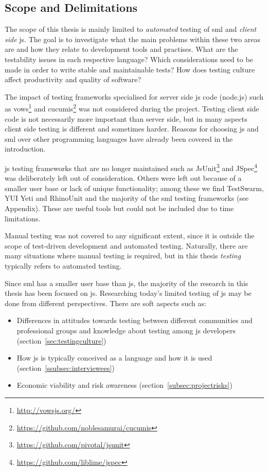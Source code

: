 \documentclass[11pt]{article}
\begin{document}
\subsection{Scope and Delimitations}

The scope of this thesis is mainly limited to \emph{automated} testing of \gls{sml} and \emph{client side} \gls{js}. The goal is to investigate what the main problems within these two areas are and how they relate to development tools and practises. What are the testability issues in each respective language? Which considerations need to be made in order to write stable and maintainable tests? How does testing culture affect productivity and quality of software?

The impact of testing frameworks specialised for server side \gls{js} code (node.js) such as vows\footnote{\url{http://vowsjs.org/}} and cucumis\footnote{\url{https://github.com/noblesamurai/cucumis}} was not considered during the project. Testing client side code is not necessarily more important than server side, but in many aspects client side testing is different and sometimes harder. Reasons for choosing \gls{js} and \gls{sml} over other programming languages have already been covered in the introduction.

\gls{js} testing frameworks that are no longer maintained such as JsUnit\footnote{\url{https://github.com/pivotal/jsunit}} and JSpec\footnote{\url{https://github.com/liblime/jspec}} was deliberately left out of consideration. Others were left out because of a smaller user base or lack of unique functionality; among these we find TestSwarm, YUI Yeti and RhinoUnit and the majority of the \gls{sml} testing frameworks (see Appendix). These are useful tools but could not be included due to time limitations.

Manual testing was not covered to any significant extent, since it is outside the scope of test-driven development and automated testing. Naturally, there are many situations where manual testing is required, but in this thesis \emph{testing} typically refers to automated testing.

Since \gls{sml} has a smaller user base than \gls{js}, the majority of the research in this thesis has been focused on \gls{js}. Researching today's limited testing of \gls{js} may be done from different perspectives. There are soft aspects such as:
\begin{itemize}[label={--}]
\item Differences in attitudes towards testing between different communities and professional groups and knowledge about testing among \gls{js} developers (section~\ref{sec:testingculture})
\item How \gls{js} is typically conceived as a language and how it is used (section~\ref{ssubsec:interviewees})
\item Economic viability and risk awareness (section~\ref{subsec:projectrisks})
\end{itemize}
\end{document}
